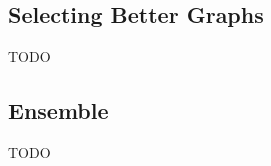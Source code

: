 \subsection{Selecting Better Graphs}
\label{subsec:chaoda:selecting-better-graphs}
TODO


\subsection{Ensemble}
\label{subsec:chaoda:ensemble}
TODO
